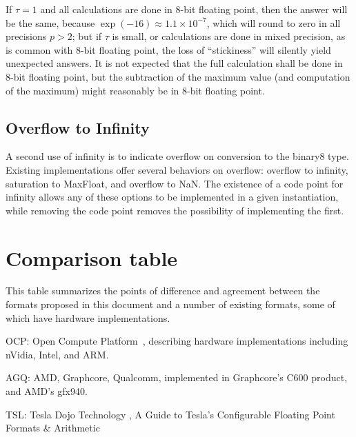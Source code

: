 \documentclass{article}
\begin{document}
If $\tau=1$ and all calculations are done in 8-bit floating point, then the answer will be the same, because $\exp(-16) \approx 1.1 \times 10^{-7}$, which will round to zero in all precisions $p>2$;
but if $\tau$ is small, or calculations are done in mixed precision, as is common with 8-bit floating point, the loss of ``stickiness'' will silently yield unexpected answers.
It is not expected that the full calculation shall be done in 8-bit floating point, but the subtraction of the maximum value (and computation of the maximum) might reasonably be in 8-bit floating point.

\subsection{Overflow to Infinity}

A second use of infinity is to indicate overflow on conversion to the binary8 type.  Existing implementations offer several behaviors on overflow: overflow to infinity, saturation to MaxFloat, and overflow to NaN.  The existence of a code point for infinity allows any of these options to be implemented in a given instantiation, while removing the code point removes the possibility of implementing the first.

\clearpage
\section{Comparison table}
This table summarizes the points of difference and agreement between the formats proposed in this document and a number of existing formats, some of which have hardware implementations.

OCP: Open Compute Platform~\cite{ocp}, describing hardware implementations including nVidia, Intel, and ARM.

AGQ: AMD, Graphcore, Qualcomm\cite{agq}, implemented in Graphcore’s C600 product, and AMD’s gfx940.

TSL: Tesla Dojo Technology \cite{dojo}, A Guide to Tesla’s Configurable Floating Point Formats \& Arithmetic 
\end{document}
